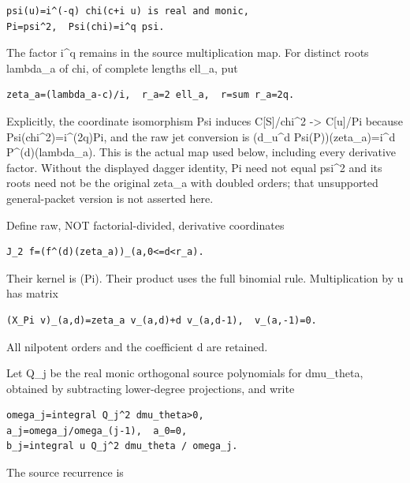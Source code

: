 \begin{Verbatim}[breaklines=true,breakanywhere=true,fontsize=\small]
psi(u)=i^(-q) chi(c+i u) is real and monic,
Pi=psi^2,  Psi(chi)=i^q psi.
\end{Verbatim}

The factor i\^{}q remains in the source multiplication map. For distinct
roots lambda\_a of chi, of complete lengths ell\_a, put

\begin{Verbatim}[breaklines=true,breakanywhere=true,fontsize=\small]
zeta_a=(lambda_a-c)/i,  r_a=2 ell_a,  r=sum r_a=2q.
\end{Verbatim}

Explicitly, the coordinate isomorphism Psi induces C{[}S{]}/chi\^{}2
-\textgreater{} C{[}u{]}/Pi because Psi(chi\^{}2)=\allowbreak{}i\^{}(2q)Pi, and the
raw jet conversion is (d\_u\^{}d Psi(P))(zeta\_a)=i\^{}d
P\^{}(d)(lambda\_a). This is the actual map used below, including every
derivative factor. Without the displayed dagger identity, Pi need not
equal psi\^{}2 and its roots need not be the original zeta\_a with
doubled orders; that unsupported general-packet version is not asserted
here.

Define raw, NOT factorial-divided, derivative coordinates

\begin{Verbatim}[breaklines=true,breakanywhere=true,fontsize=\small]
J_2 f=(f^(d)(zeta_a))_(a,0<=d<r_a).
\end{Verbatim}

Their kernel is (Pi). Their product uses the full binomial rule.
Multiplication by u has matrix

\begin{Verbatim}[breaklines=true,breakanywhere=true,fontsize=\small]
(X_Pi v)_(a,d)=zeta_a v_(a,d)+d v_(a,d-1),  v_(a,-1)=0.
\end{Verbatim}

All nilpotent orders and the coefficient d are retained.

Let Q\_j be the real monic orthogonal source polynomials for dmu\_theta,
obtained by subtracting lower-degree projections, and write

\begin{Verbatim}[breaklines=true,breakanywhere=true,fontsize=\small]
omega_j=integral Q_j^2 dmu_theta>0,
a_j=omega_j/omega_(j-1),  a_0=0,
b_j=integral u Q_j^2 dmu_theta / omega_j.
\end{Verbatim}

The source recurrence is

